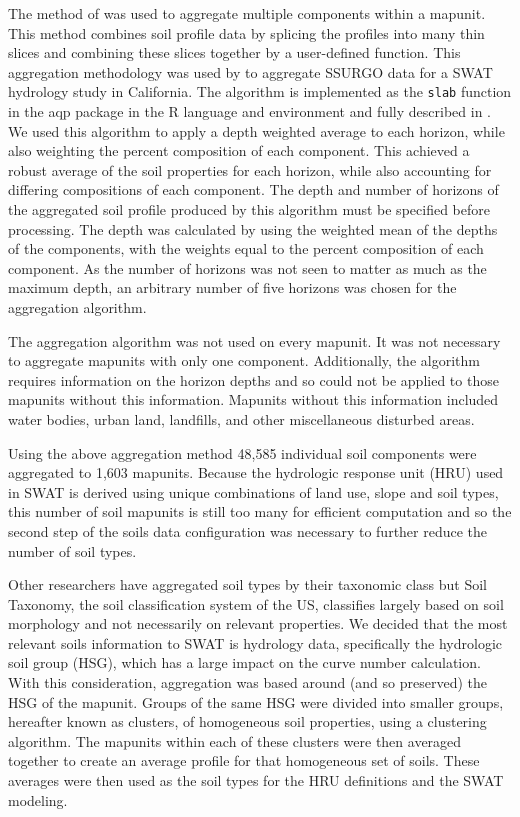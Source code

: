The method of \citet{beaudette_algorithms_2013} was used to aggregate multiple components within a mapunit. This method combines soil profile data by splicing the profiles into many thin slices and combining these slices together by a user-defined function. This aggregation methodology was used by \citet{gatzke_aggregation_2011} to aggregate SSURGO data for a SWAT hydrology study in California. The algorithm is implemented as the \texttt{slab} function in the aqp package in the R language and environment and fully described in \citet{beaudette_algorithms_2013}. We used this algorithm to apply a depth weighted average to each horizon, while also weighting the percent composition of each component. This achieved a robust average of the soil properties for each horizon, while also accounting for differing compositions of each component. The depth and number of horizons of the aggregated soil profile produced by this algorithm must be specified before processing. The depth was calculated by using the weighted mean of the depths of the components, with the weights equal to the percent composition of each component. As the number of horizons was not seen to matter as much as the maximum depth, an arbitrary number of five horizons was chosen for the aggregation algorithm. 

The aggregation algorithm was not used on every mapunit. It was not necessary to aggregate mapunits with only one component. Additionally, the algorithm requires information on the horizon depths and so could not be applied to those mapunits without this information. Mapunits without this information included water bodies, urban land, landfills, and other miscellaneous disturbed areas. 

Using the above aggregation method 48,585 individual soil components were aggregated to 1,603 mapunits. Because the hydrologic response unit (HRU) used in SWAT	is derived using unique combinations of land use, slope and soil types, this number of soil mapunits is still too many for efficient computation  and so the second step of the soils data configuration was necessary to further reduce the number of soil types. %

Other researchers have aggregated soil types by their taxonomic class \citep{gatzke_aggregation_2011} but Soil Taxonomy, the soil classification system of the US, classifies largely based on soil morphology and not necessarily on relevant properties. We decided that the most relevant soils information to SWAT is hydrology data, specifically the hydrologic soil group (HSG), which has a large impact on the curve number calculation. With this consideration, aggregation was based around (and so preserved) the HSG of the mapunit. Groups of the same HSG were divided into smaller groups, hereafter known as clusters, of homogeneous soil properties, using a clustering algorithm. The mapunits within each of these clusters were then averaged together to create an average profile for that homogeneous set of soils. These averages were then used as the soil types for the HRU definitions and the SWAT modeling.

